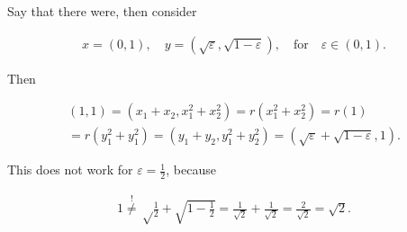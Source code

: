 \begin{solution}
\begin{enumerate}[label = (\alph*)]
    Say that there were, then consider

    \begin{align*}
        x = (0, 1),
        \quad
        y = (\sqrt \varepsilon, \sqrt{1 - \varepsilon}),
        \quad
        \text{for}
        \quad
        \varepsilon \in (0, 1).
    \end{align*}

    Then

    \begin{multline*}
        (1, 1)
        =
        (x_1 + x_2, x_1^2 + x_2^2)
        =
        r(x_1^2 + x_2^2)
        =
        r(1) \\
        =
        r(y_1^2 + y_1^2)
        =
        (y_1 + y_2, y_1^2 + y_2^2)
        =
        (\sqrt \varepsilon + \sqrt{1 - \varepsilon}, 1).
    \end{multline*}

    This does not work for $\varepsilon = \frac{1}{2}$, because

    \begin{align*}
        1
        \stackrel{!}{\neq}
        \sqrt \frac{1}{2} + \sqrt{1 - \frac{1}{2}}
        =
        \frac{1}{\sqrt 2} + \frac{1}{\sqrt 2}
        =
        \frac{2}{\sqrt 2}
        =
        \sqrt 2.
    \end{align*}

\end{enumerate}

\end{solution}

